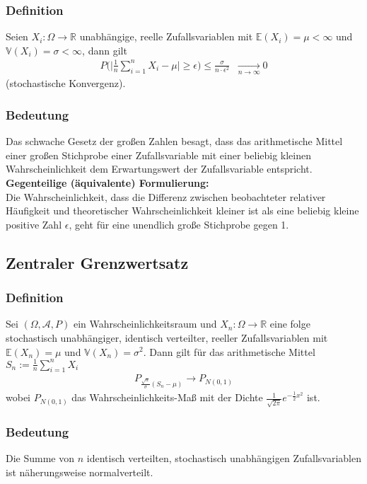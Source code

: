 \documentclass[a4paper]{article}
\begin{document}
\subsubsection{Definition}
Seien $X_i : \Omega \to \mathbb{R}$ unabhängige, reelle Zufallsvariablen mit $\mathbb{E}(X_i) = \mu < \infty$ und $\mathbb{V}(X_i) = \sigma < \infty$, dann gilt
\begin{align*}
P \bigl  ( \bigl | \frac{1}{n} \sum_{i=1}^{n} X_i - \mu \bigr |  \geq \epsilon \bigr) \leq \frac{\sigma}{ n \cdot \epsilon^2} \; \; \underset{n \to \infty}{\longrightarrow} 0
\end{align*}
(stochastische Konvergenz). 

\subsubsection{Bedeutung}
Das schwache Gesetz der großen Zahlen besagt, dass das arithmetische Mittel einer großen Stichprobe einer Zufallsvariable mit einer beliebig kleinen Wahrscheinlichkeit dem Erwartungswert der Zufallsvariable entspricht.\\

\textbf{Gegenteilige (äquivalente) Formulierung:}\\
Die Wahrscheinlichkeit, dass die Differenz zwischen beobachteter relativer Häufigkeit und theoretischer Wahrscheinlichkeit kleiner ist als eine beliebig kleine positive Zahl $\epsilon$, geht für eine unendlich große Stichprobe gegen 1.


\subsection{Zentraler Grenzwertsatz}

\subsubsection{Definition}
Sei $(\Omega, \mathcal{A}, P)$ ein Wahrscheinlichkeitsraum und $X_n :  \Omega \to \mathbb{R}$  eine folge stochastisch unabhängiger, identisch verteilter, reeller Zufallsvariablen mit $\mathbb{E}(X_n) = \mu$ und $\mathbb{V}(X_n)= \sigma^2$. Dann gilt für das arithmetische Mittel $S_n:= \frac{1}{n} \sum_{i=1}^n X_i$
\begin{align*}
P_{ \frac{\sqrt{n}}{\sigma} (S_n-\mu)} \to P_{N(0,1)}
\end{align*}
wobei $ P_{N(0,1)}$ das Wahrscheinlichkeits-Maß mit der Dichte $ \frac {1}{ \sqrt{2\pi}}e^{- \frac {1}{2} x^2}$ ist.
\subsubsection{Bedeutung}
Die Summe von $n$ identisch verteilten, stochastisch unabhängigen Zufallsvariablen ist näherungsweise normalverteilt.\\
\end{document}
